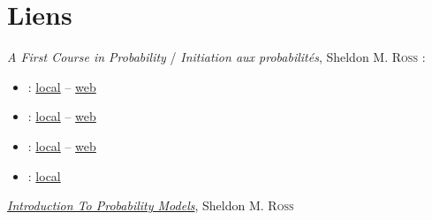 \chapter*{Liens}

\emph{A First Course in Probability} / \emph{Initiation aux probabilités}, Sheldon M. \textsc{Ross} :
\newlength{\longueur}
\begin{itemize}
	\item {} : 
		\href{ross/4EdFr.pdf}{local} -- 
		\href{https://docplayer.fr/2602735-Initiation-aux-probabilites.html}{web}
	\item {} :
		\href{ross/7EdSolEn.pdf}{local} -- \href{https://www.studocu.com/row/document/yildiz-teknik-ueniversitesi/ergonomi/lecture-notes/a-first-course-in-probability-7ed-solution-manual-prentice-hall-147s-sheldon-ross/7242179/view}{web}
	\item {} :
		\href{ross/8EdEn.pdf}{local} --
		\href{http://julio.staff.ipb.ac.id/files/2015/02/Ross_8th_ed_English.pdf}{web}
	\item {} :
		\href{ross/10EdEn.pdf}{local}
\end{itemize}

\href{ross/introductionToProbabilityModels.pdf}{\emph{Introduction To Probability Models}}, Sheldon M. \textsc{Ross}
